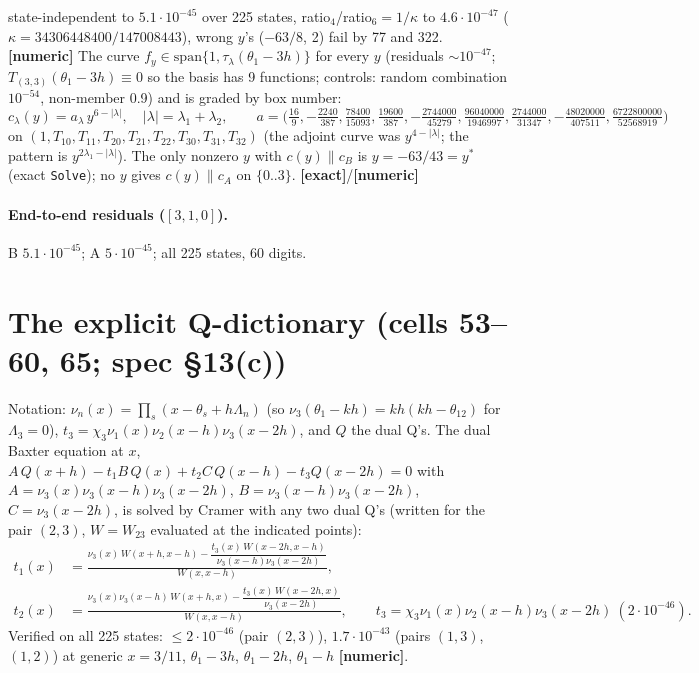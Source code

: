 \documentclass[11pt]{article}
\newcommand{\Tt}[1]{T_{#1}}
\newcommand{\thh}{\theta_{12}}
\newcommand{\ex}{\textbf{[exact]}}
\newcommand{\nm}{\textbf{[numeric]}}
\begin{document}
state-independent to $5.1\cdot10^{-45}$ over 225 states, ratio$_4$/ratio$_6=1/\kappa$ to $4.6\cdot10^{-47}$ ($\kappa=34306448400/147008443$), wrong $y$'s ($-63/8$, 2) fail by 77 and 322. \nm{} The curve $f_y\in\mathrm{span}\{1,\tau_\lambda(\theta_1-3h)\}$ for every $y$ (residuals $\sim10^{-47}$; $T_{(3,3)}(\theta_1-3h)\equiv0$ so the basis has 9 functions; controls: random combination $10^{-54}$, non-member 0.9) and is graded by box number:
\[
c_\lambda(y)=a_\lambda\,y^{6-|\lambda|},\quad|\lambda|=\lambda_1+\lambda_2,\qquad a=\Big(\tfrac{16}9,-\tfrac{2240}{387},\tfrac{78400}{15093},\tfrac{19600}{387},-\tfrac{2744000}{45279},\tfrac{96040000}{1946997},\tfrac{2744000}{31347},-\tfrac{48020000}{407511},\tfrac{6722800000}{52568919}\Big)
\]
on $(1,\Tt{10},\Tt{11},\Tt{20},\Tt{21},\Tt{22},\Tt{30},\Tt{31},\Tt{32})$ (the adjoint curve was $y^{4-|\lambda|}$; the pattern is $y^{2\lambda_1-|\lambda|}$). The only nonzero $y$ with $c(y)\parallel c_B$ is $y=-63/43=y^*$ (exact \texttt{Solve}); no $y$ gives $c(y)\parallel c_A$ on $\{0..3\}$. \ex/\nm

\paragraph{End-to-end residuals ($[3,1,0]$).} B $5.1\cdot10^{-45}$; A $5\cdot10^{-45}$; all 225 states, 60 digits.

\section{The explicit Q-dictionary (cells 53--60, 65; spec \S13(c))}\label{sec:dict}

Notation: $\nu_n(x)=\prod_s(x-\theta_s+h\Lambda_n)$ (so $\nu_3(\theta_1-kh)=kh(kh-\thh)$ for $\Lambda_3=0$), $t_3=\chi_3\nu_1(x)\nu_2(x-h)\nu_3(x-2h)$, and $Q$ the dual Q's. The dual Baxter equation at $x$, $A\,Q(x+h)-t_1B\,Q(x)+t_2C\,Q(x-h)-t_3Q(x-2h)=0$ with $A=\nu_3(x)\nu_3(x-h)\nu_3(x-2h)$, $B=\nu_3(x-h)\nu_3(x-2h)$, $C=\nu_3(x-2h)$, is solved by Cramer with any two dual Q's (written for the pair $(2,3)$, $W=W_{23}$ evaluated at the indicated points):
\begin{align}
t_1(x)&=\frac{\nu_3(x)\,W(x{+}h,x{-}h)-\dfrac{t_3(x)\,W(x{-}2h,x{-}h)}{\nu_3(x-h)\nu_3(x-2h)}}{W(x,x{-}h)},\\
t_2(x)&=\frac{\nu_3(x)\nu_3(x-h)\,W(x{+}h,x)-\dfrac{t_3(x)\,W(x{-}2h,x)}{\nu_3(x-2h)}}{W(x,x{-}h)},\qquad t_3=\chi_3\nu_1(x)\nu_2(x-h)\nu_3(x-2h)\ (2\cdot10^{-46}).\nonumber
\end{align}
Verified on all 225 states: $\le2\cdot10^{-46}$ (pair $(2,3)$), $1.7\cdot10^{-43}$ (pairs $(1,3)$, $(1,2)$) at generic $x=3/11$, $\theta_1-3h$, $\theta_1-2h$, $\theta_1-h$ \nm.
\end{document}
